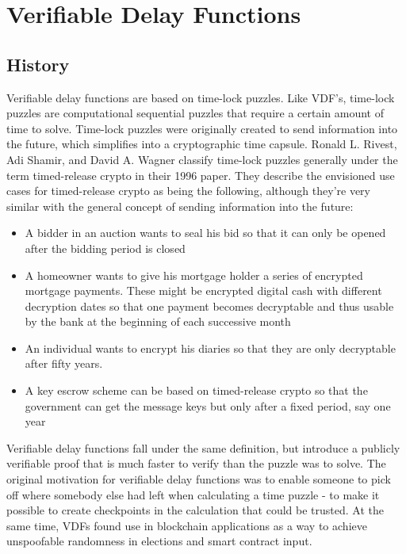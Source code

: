 \chapter{Verifiable Delay Functions}
\label{Verifiable Delay Functions}



\section{History}
Verifiable delay functions are based on time-lock puzzles. Like VDF's, time-lock puzzles are computational sequential puzzles that require a certain amount of time to solve.\cite{Rivest_undated-qr} Time-lock puzzles were originally created to send information into the future, which simplifies into a cryptographic time capsule. Ronald L. Rivest, Adi Shamir, and David A. Wagner classify time-lock puzzles generally under the term timed-release crypto in their 1996 paper. They describe the envisioned use cases for timed-release crypto as being the following, although they're very similar with the general concept of sending information into the future:

\begin{itemize}
  \item A bidder in an auction wants to seal his bid so that it can only be opened after the bidding period is closed 
  \item A homeowner wants to give his mortgage holder a series of encrypted mortgage payments. These might be encrypted digital cash with different decryption dates so that one payment becomes decryptable and thus usable by the bank at the beginning of each successive month
  \item An individual wants to encrypt his diaries so that they are only decryptable after fifty years.
  \item A key escrow scheme can be based on timed-release crypto so that the government can get the message keys but only after a fixed period, say one year
\end{itemize}

Verifiable delay functions fall under the same definition, but introduce a publicly verifiable proof that is much faster to verify than the puzzle was to solve. The original motivation for verifiable delay functions was to enable someone to pick off where somebody else had left when calculating a time puzzle - to make it possible to create checkpoints in the calculation that could be trusted. At the same time, VDFs found use in blockchain applications as a way to achieve unspoofable randomness in elections and smart contract input.

